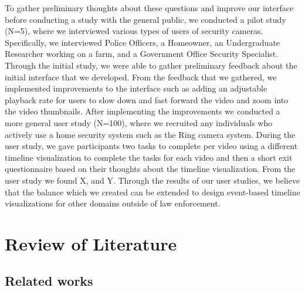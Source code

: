 \documentclass[doublespace,draft,nopageskip]{VTthesis} %
\begin{document}
To gather preliminary thoughts about these questions and improve our interface before conducting a study with the general public, we conducted a pilot study (N=5), where we interviewed various types of users of security cameras. 
Specifically, we interviewed Police Officers, a Homeowner, an Undergraduate Researcher working on a farm, and a Government Office Security Specialist. 
Through the initial study, we were able to gather preliminary feedback about the initial interface that we developed. 
From the feedback that we gathered, we implemented improvements to the interface such as adding an adjustable playback rate for users to slow down and fast forward the video and zoom into the video thumbnails. 
After implementing the improvements we conducted a more general user study (N=100), where we recruited any individuals who actively use a home security system such as the Ring camera system. 
During the user study, we gave participants two tasks to complete per video using a different timeline visualization to complete the tasks for each video and then a short exit questionnaire based on their thoughts about the timeline visualization. 
From the user study we found X, and Y. 
Through the results of our user studies, we believe that the balance which we created can be extended to design event-based timeline visualizations for other domains outside of law enforcement. 
      

\chapter{Review of Literature} \label{ch:lit_review}
\section{Related works} \label{se:one_section}
\end{document}

